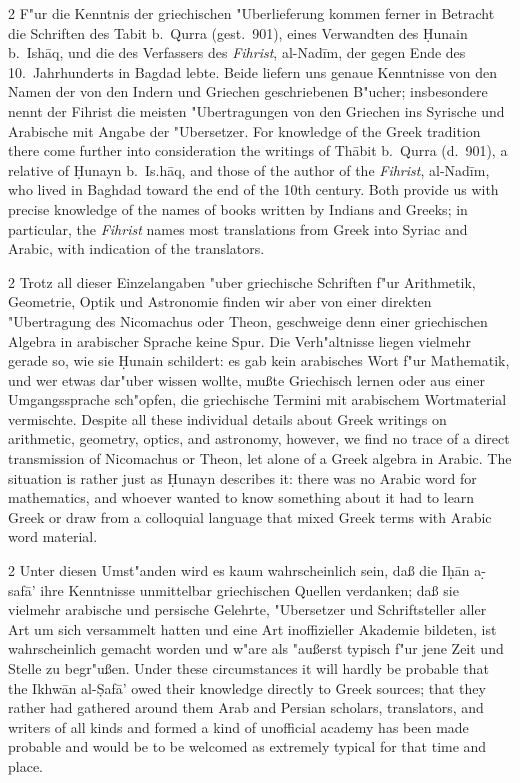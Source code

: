 \documentclass[10pt,a4paper]{article}
\renewcommand{\switchcolumn}{\syncronize\nointerlineskip\columnbreak}
\newcommand{\s}[1]{\d{#1}}
\newcommand{\hw}{\d{h}}
\begin{document}
\begin{paracol}{2}
F"ur die Kenntnis der griechischen "Uberlieferung kommen ferner in Betracht die Schriften des Tabit b.\ Qurra (gest.\ 901), eines Verwandten des \d{H}unain b.\ Ish\=aq, und die des Verfassers des \textit{Fihrist}, al-Nad\={i}m, der gegen Ende des 10.\ Jahrhunderts in Bagdad lebte. Beide liefern uns genaue Kenntnisse von den Namen der von den Indern und Griechen geschriebenen B"ucher; insbesondere nennt der Fihrist die meisten "Ubertragungen von den Griechen ins Syrische und Arabische mit Angabe der "Ubersetzer.
\switchcolumn
For knowledge of the Greek tradition there come further into consideration the writings of Th\=abit b.\ Qurra (d.\ 901), a relative of \d{H}unayn b.\ Is.h\=aq, and those of the author of the \textit{Fihrist}, al-Nad\={i}m, who lived in Baghdad toward the end of the 10th century. Both provide us with precise knowledge of the names of books written by Indians and Greeks; in particular, the \textit{Fihrist} names most translations from Greek into Syriac and Arabic, with indication of the translators.
\end{paracol}

\begin{paracol}{2}
Trotz all dieser Einzelangaben "uber griechische Schriften f"ur Arithmetik, Geometrie, Optik und Astronomie finden wir aber von einer direkten "Ubertragung des Nicomachus oder Theon, geschweige denn einer griechischen Algebra in arabischer Sprache keine Spur. Die Verh"altnisse liegen vielmehr gerade so, wie sie \d{H}unain schildert: es gab kein arabisches Wort f"ur Mathematik, und wer etwas dar"uber wissen wollte, mu\ss{}te Griechisch lernen oder aus einer Umgangssprache sch"opfen, die griechische Termini mit arabischem Wortmaterial vermischte.
\switchcolumn
Despite all these individual details about Greek writings on arithmetic, geometry, optics, and astronomy, however, we find no trace of a direct transmission of Nicomachus or Theon, let alone of a Greek algebra in Arabic. The situation is rather just as \d{H}unayn describes it: there was no Arabic word for mathematics, and whoever wanted to know something about it had to learn Greek or draw from a colloquial language that mixed Greek terms with Arabic word material.
\end{paracol}

\begin{paracol}{2}
Unter diesen Umst"anden wird es kaum wahrscheinlich sein, da\ss{} die I\hw{}\=an a\s-s{}af\=a' ihre Kenntnisse unmittelbar griechischen Quellen verdanken; da\ss{} sie vielmehr arabische und persische Gelehrte, "Ubersetzer und Schriftsteller aller Art um sich versammelt hatten und eine Art inoffizieller Akademie bildeten, ist wahrscheinlich gemacht worden und w"are als "au\ss{}erst typisch f"ur jene Zeit und Stelle zu begr"u\ss{}en.
\switchcolumn
Under these circumstances it will hardly be probable that the Ikhw\=an al-\d{S}af\=a' owed their knowledge directly to Greek sources; that they rather had gathered around them Arab and Persian scholars, translators, and writers of all kinds and formed a kind of unofficial academy has been made probable and would be to be welcomed as extremely typical for that time and place.
\end{paracol}
\end{document}
